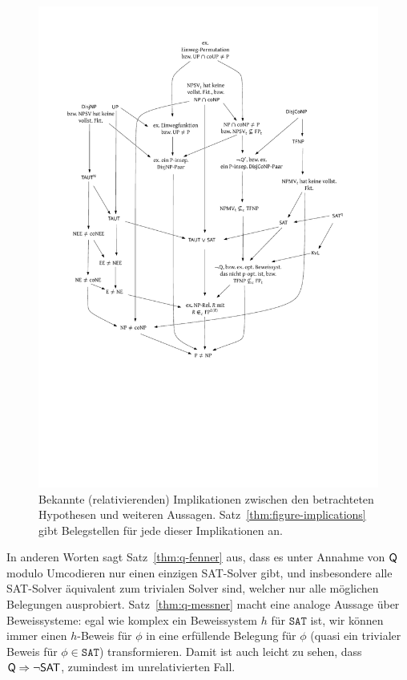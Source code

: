 \begin{figure}[p]
    \includegraphics[page=1]{figures.pdf}
    \caption{Bekannte (relativierenden) Implikationen zwischen den betrachteten Hypothesen und weiteren Aussagen. Satz~\ref{thm:figure-implications} gibt Belegstellen für jede dieser Implikationen an.}\label{fig:figure-implications}
    \forcerectofloat
\end{figure}

In anderen Worten sagt Satz~\ref{thm:q-fenner} aus, dass es unter Annahme von $\mathsf{Q}$ modulo Umcodieren nur einen einzigen SAT-Solver gibt, und insbesondere alle SAT-Solver äquivalent zum trivialen Solver sind, welcher nur alle möglichen Belegungen ausprobiert.
Satz~\ref{thm:q-messner} macht eine analoge Aussage über Beweissysteme: egal wie komplex ein Beweissystem $h$ für $\mathtt{SAT}$ ist, wir können immer einen $h$-Beweis für $\phi$ in eine erfüllende Belegung für $\phi$ (quasi ein trivialer Beweis für $\phi\in\mathtt{SAT}$) transformieren. Damit ist auch leicht zu sehen, dass $\mathsf{Q}\Rightarrow \neg\mathsf{SAT}$, zumindest im unrelativierten Fall.

